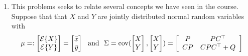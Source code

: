 \documentclass[letterpaper]{article}
\begin{document}
\begin{enumerate}
$$ \left[\begin{array}{cccc}  <y_1, y_1>&    <y_2, y_1> & \cdots &  <y_p, y_1>\\    <y_1, y_2>&  <y_2, y_2> & \cdots &  <y_p, y_2>
\\
\vdots&   \vdots & \ddots &  \vdots
\\
<y_1, y_p>&    <y_2, y_p> & \cdots &  <y_p, y_p>\end{array} \right]  \left[\begin{array}{c} \beta_1 \\ \beta_2 \\ \vdots \\ \beta_p\end{array} \right] =  \left[\begin{array}{c} c_1 \\c_2 \\ \vdots \\ c_p \end{array} \right] $$\\
  \textbf{Remark:} What you have just solved is a special case of a Quadratic Program, typically called a \textbf{QP} for short. We'll talk more about this in next week's HW set!
\\

\item This problems seeks to relate several concepts we have seen in the course. Suppose that that $X$ and $Y$ are jointly distributed normal random variables with
 $$\mu =:\begin{bmatrix} \mathcal{E}\{X\} \\  \mathcal{E}\{Y\} \end{bmatrix} = \begin{bmatrix} \bar{x} \\ \bar{y} \end{bmatrix}~~\text{and}~~\Sigma = \mathrm{cov}(\begin{bmatrix} X \\ Y \end{bmatrix}, \begin{bmatrix} X \\ Y \end{bmatrix}) = \left[ \begin{array}{cc} P & PC^\top \\  C P & CPC^\top + Q \end{array} \right]$$

  \begin{enumerate}
\setlength{\itemsep}{.1in}
\renewcommand{\labelenumi}{(\alph{enumi})}


\end{enumerate}
\end{enumerate}
\end{document}
